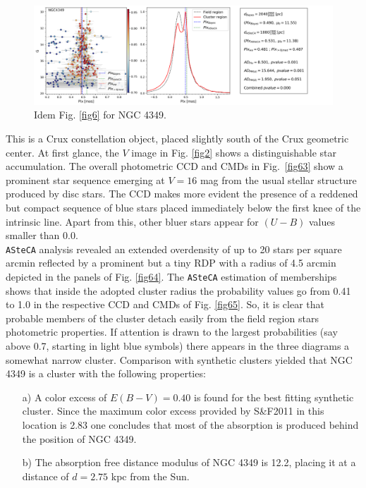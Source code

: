 \documentclass[draft]{aa}
\begin{document}
\begin{figure}[ht]
    \centering
    \includegraphics[width=\hsize]{../figs/plx_NGC4349.png}
    \caption{Idem Fig. \ref{fig6} for NGC 4349.}
    \label{fig66}
\end{figure}


This is a Crux constellation object, placed slightly south of the Crux geometric
center. At first glance, the $V$ image in Fig. \ref{fig2} shows a
distinguishable star accumulation. The overall photometric CCD and CMDs in
Fig.~\ref{fig63} show a prominent star sequence emerging at $V=16$ mag from the
usual stellar structure produced by disc stars. The CCD makes more evident the
presence of a reddened but compact sequence of blue stars placed immediately
below the first knee of the intrinsic line. Apart from this, other bluer stars
appear for $(U-B)$ values smaller than 0.0.\\ 

\texttt{ASteCA} analysis revealed an extended overdensity of up to 20 stars per
square arcmin reflected by a prominent but a tiny RDP with a radius of 4.5
arcmin depicted in the panels of Fig. \ref{fig64}.
The \texttt{ASteCA} estimation of memberships shows that inside the adopted
cluster radius the probability values go from 0.41 to 1.0 in the respective
CCD and CMDs of Fig. \ref{fig65}. So, it is clear that probable members of the
cluster detach easily from the field region stars photometric properties. If
attention is drawn to the largest probabilities (say above 0.7, starting in
light blue symbols) there appears in the three diagrams a somewhat narrow
cluster. Comparison with synthetic clusters yielded that NGC 4349 is a cluster
with the following properties:

\begin{itemize}
    \item [a)] A color excess of $E(B-V)= 0.40$ is found for the best fitting
    synthetic cluster. Since the maximum color excess provided by
    S\&F2011 in this location is 2.83 one concludes that most of the
    absorption is produced behind the position of NGC 4349.
    \item [b)] The absorption free distance modulus of NGC 4349 is 12.2,
    placing it at a distance of $d=2.75$ kpc from the Sun. 
\end{itemize}
\end{document}
